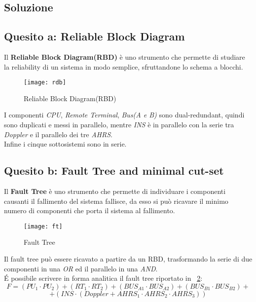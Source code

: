 \clearpage
\subsection{Soluzione}

\subsection{Quesito a: Reliable Block Diagram}

Il \textbf{Reliable Block Diagram(RBD)} è uno strumento che permette di studiare
la reliability di un sistema in modo semplice, sfruttandone lo schema a blocchi.\\

\begin{figure}[!htbp]
  \centering
  \texttt{[image: rdb]}
  \caption{Reliable Block Diagram(RBD)}
  \label{dep_rdb}
\end{figure}

I componenti \textit{CPU}, \textit{Remote Terminal}, \textit{Bus(A e B)} sono
dual-redundant, quindi sono duplicati e messi in parallelo, mentre \textit{INS} è
in parallelo con la serie tra \textit{Doppler} e il parallelo dei tre \textit{AHRS}.\\
Infine i cinque sottosistemi sono in serie.

\subsection{Quesito b: Fault Tree and minimal cut-set}

Il \textbf{Fault Tree} è uno strumento che permette di individuare i componenti
causanti il fallimento del sistema fallisce, da esso si può ricavare il minimo numero di
componenti che porta il sistema al fallimento.

\begin{figure}[!htbp]
  \centering
  \texttt{[image: ft]}
  \caption{Fault Tree}
  \label{dep_ft}
\end{figure}

Il fault tree può essere ricavato a partire da un RBD, trasformando
la serie di due componenti in una \textit{OR} ed il parallelo in una \textit{AND}.\\

\'E possibile scrivere in forma analitica il fault tree riportato in \figurename~\ref{dep_ft}:
$$ F = (PU_1 \cdot PU_2) + (RT_1 \cdot RT_2) + (BUS_{A1} \cdot BUS_{A2}) + (BUS_{B1} \cdot BUS_{B2})+$$
$$+ (INS \cdot (Doppler+AHRS_1 \cdot AHRS_2 \cdot AHRS_3))$$

